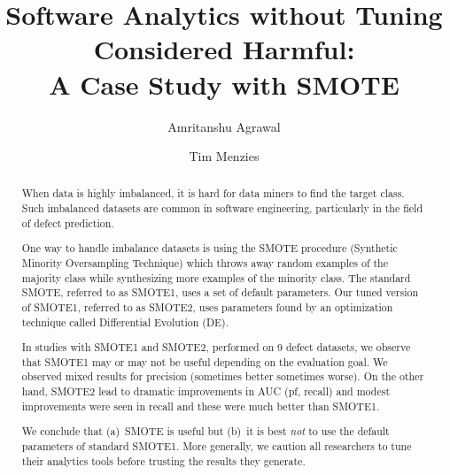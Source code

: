 \documentclass[sigconf,review, anonymous]{acmart}
\theoremstyle{break}
\theoremstyle{break}
\begin{document}

\title{Software Analytics
without Tuning Considered Harmful:\\A
Case Study with SMOTE}

\author{Amritanshu Agrawal}

\author{Tim Menzies}



\begin{abstract}
When data is highly imbalanced, it is
hard for data miners to find the target
class. Such imbalanced datasets are
common in software engineering,
particularly in the field of defect prediction.


One way to handle imbalance datasets is using the SMOTE procedure (Synthetic Minority Oversampling Technique) which 
throws away random examples of the majority
class while synthesizing
more examples 
of the minority class.
The standard SMOTE,
referred to as SMOTE1,
uses a set of default parameters. Our tuned version
of SMOTE1, referred to as SMOTE2,
uses parameters  found by an optimization technique
called Differential Evolution (DE). 

 In studies with SMOTE1 and SMOTE2, performed on
 9 defect datasets, we observe that SMOTE1 may or may not be useful depending on the evaluation goal. We observed mixed results for precision (sometimes better sometimes worse).
On the other hand, SMOTE2 lead to dramatic improvements in  AUC (pf, recall) and modest improvements were seen in recall and these were much better than SMOTE1.

We conclude that (a)~SMOTE
is useful but (b)~it is best {\em not} to use the default parameters of standard SMOTE1. More generally, we caution all researchers to tune their analytics tools before
trusting the results they generate.
\end{abstract}


\maketitle
\end{document}
